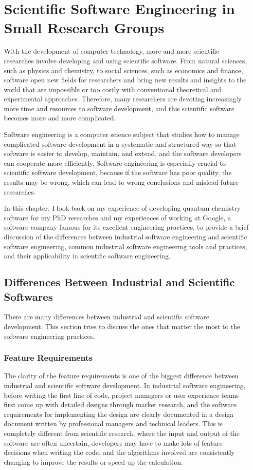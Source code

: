 \chapter{Scientific Software Engineering in Small Research Groups}
With the development of computer technology, more and more scientific researches involve developing and using scientific software.
From natural sciences, such as physics and chemistry, to social sciences, such as economics and finance, software open new fields for researchers and bring new results and insights to the world that are impossible or too costly with conventional theoretical and experimental approaches.
Therefore, many researchers are devoting increasingly more time and resources to software development, and this scientific software becomes more and more complicated.

Software engineering is a computer science subject that studies how to manage complicated software development in a systematic and structured way so that software is easier to develop, maintain, and extend, and the software developers can cooperate more efficiently.
Software engineering is especially crucial to scientific software development, because if the software has poor quality, the results may be wrong, which can lead to wrong conclusions and mislead future researches.

In this chapter, I look back on my experience of developing quantum chemistry software for my PhD researches and my experiences of working at Google, a software company famous for its excellent engineering practices, to provide a brief discussion of the differences between industrial software engineering and scientific software engineering, common industrial software engineering tools and practices, and their applicability in scientific software engineering.

\section{Differences Between Industrial and Scientific Softwares}

There are many differences between industrial and scientific software development.
This section tries to discuss the ones that matter the most to the software engineering practices.

\subsection{Feature Requirements}
The clarity of the feature requirements is one of the biggest difference between industrial and scientific software development.
In industrial software engineering, before writing the first line of code, project managers or user experience teams first come up with detailed designs through market research, and the software requirements for implementing the design are clearly documented in a design document written by professional managers and technical leaders.
This is completely different from scientific research, where the input and output of the software are often uncertain, developers may have to make lots of feature decisions when writing the code, and the algorithms involved are consistently changing to improve the results or speed up the calculation.

